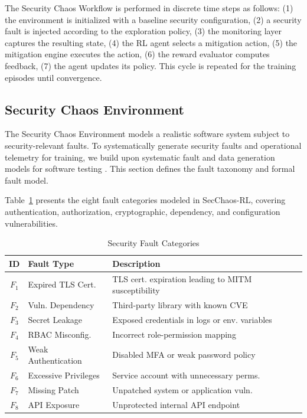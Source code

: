 \documentclass[pdflatex,sn-mathphys-num]{sn-jnl}%
\theoremstyle{thmstyleone}%
\theoremstyle{thmstyletwo}%
\theoremstyle{thmstylethree}%
\begin{document}
	The Security Chaos Workflow is performed in discrete time steps as follows: (1) the environment is initialized with a baseline security configuration, (2) a security fault is injected according to the exploration policy, (3) the monitoring layer captures the resulting state, (4) the RL agent selects a mitigation action, (5) the mitigation engine executes the action, (6) the reward evaluator computes feedback, (7) the agent updates its policy. This cycle is repeated for the training episodes until convergence. 
	
	\subsection{Security Chaos Environment}
	
	The Security Chaos Environment models a realistic software system subject to security-relevant faults. To systematically generate security faults and operational telemetry for training, we build upon systematic fault and data generation models for software testing \cite{baghorn2022fault}. This section defines the fault taxonomy and formal fault model.
	
	Table~\ref{tab:fault_categories} presents the eight fault categories modeled in SecChaos-RL, covering authentication, authorization, cryptographic, dependency, and configuration vulnerabilities.
	
	\begin{table}[h]
		\centering
		\caption{Security Fault Categories}
		\label{tab:fault_categories}
		\footnotesize
		\begin{tabular}{@{}clp{3.2cm}@{}}
			\toprule
			\textbf{ID} & \textbf{Fault Type} & \textbf{Description} \\
			\midrule
			$F_1$ & Expired TLS Cert. & TLS cert. expiration leading to MITM susceptibility \\
			$F_2$ & Vuln. Dependency & Third-party library with known CVE \\
			$F_3$ & Secret Leakage & Exposed credentials in logs or env. variables \\
			$F_4$ & RBAC Misconfig. & Incorrect role-permission mapping \\
			$F_5$ & Weak Authentication & Disabled MFA or weak password policy \\
			$F_6$ & Excessive Privileges & Service account with unnecessary perms. \\
			$F_7$ & Missing Patch & Unpatched system or application vuln. \\
			$F_8$ & API Exposure & Unprotected internal API endpoint \\
			\bottomrule
		\end{tabular}
	\end{table}
	
\end{document}
